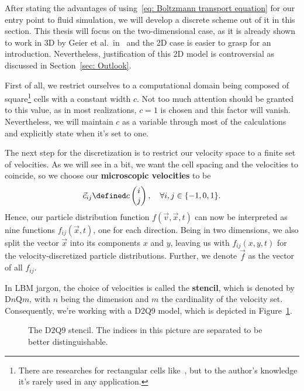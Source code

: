 After stating the advantages of using~\eqref{eq: Boltzmann transport equation} for our entry point to fluid simulation, we will develop a discrete scheme out of it in this section.
This thesis will focus on the two-dimensional case, as it is already shown to work in 3D by Geier et al.\ in~\cite{geier2015cumulant} and the 2D case is easier to grasp for an introduction. Nevertheless, justification of this 2D model is controversial as discussed in Section~\ref{sec: Outlook}.

First of all, we restrict ourselves to a computational domain being composed of square\footnote{There are researches for rectangular cells like~\cite{Bouzidi2001704}, but to the author's knowledge it's rarely used in any application.} cells with a constant width $c$.
Not too much attention should be granted to this value, as in most realizations, $c=1$ is chosen and this factor will vanish.
Nevertheless, we will maintain $c$ as a variable through most of the calculations and explicitly state when it's set to one.

The next step for the discretization is to restrict our velocity space to a finite set of velocities. As we will see in a bit, we want the cell spacing and the velocities to coincide, so we choose our \textbf{microscopic velocities} to be
\begin{equation}
  \label{eq: definition of the velocities}
  \vec{c}_{ij} \defined c\begin{pmatrix}i \\ j\end{pmatrix}, \quad\forall i,j\in \{-1, 0, 1\}.
\end{equation}
Hence, our particle distribution function $f(\vec{v},\vec{x},t)$ can now be interpreted as nine functions $f_{ij}(\vec{x},t)$, one for each direction.
Being in two dimensions, we also split the vector $\vec{x}$ into its components $x$ and $y$, leaving us with $f_{ij}(x,y,t)$ for the velocity-discretized particle distributions.
Further, we denote $\vec{f}$ as the vector of all $f_{ij}$.

In LBM jargon, the choice of velocities is called the \textbf{stencil}, which is denoted by D$n$Q$m$, with $n$ being the dimension and $m$ the cardinality of the velocity set.
Consequently, we're working with a D2Q9 model, which is depicted in Figure~\ref{fig: D2Q9 stencil}.

\begin{figure}
  \centering
  
\caption{The D$2$Q$9$ stencil. The indices in this picture are separated to be better distinguishable.}
\label{fig: D2Q9 stencil}
\end{figure}

